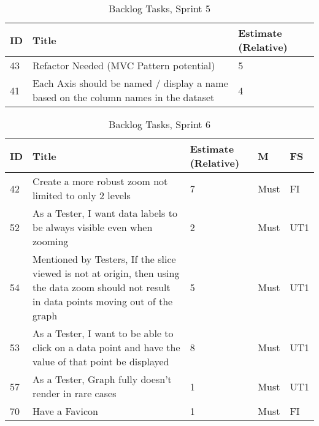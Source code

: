 \begin{table*}[hbt!]
    \begin{tabular}{ | l | l | l | }
        \hline
        ID & Title                                                                               & Estimate (Relative) \\
        \hline
        43 & Refactor Needed (MVC Pattern potential)                                             & 5                   \\
        \hline
        41 & Each Axis should be named / display a name based on the column names in the dataset & 4                   \\
        \hline
    \end{tabular}
    \caption{Backlog Tasks, Sprint 5}
    \label{sprint5}
\end{table*}

\begin{table*}[hbt!]
    \begin{tabular}{ | l | l | l | l | l | }
        \hline
        ID & Title                                                                                                                                                  & Estimate (Relative) & M    & FS  \\
        \hline
        42 & Create a more robust zoom not limited to only 2 levels                                                                                                 & 7                   & Must & FI  \\
        \hline
        52 & As a Tester, I want data labels to be always visible even when zooming                                                                                 & 2                   & Must & UT1 \\
        \hline
        54 & Mentioned by Testers, If the slice viewed is not at origin, \newline then using the data zoom should not result in data points moving out of the graph & 5                   & Must & UT1 \\
        \hline
        53 & As a Tester, I want to be able to click on a data point and have the value of that point be displayed                                                  & 8                   & Must & UT1 \\
        \hline
        57 & As a Tester, Graph fully doesn't render in rare cases                                                                                                  & 1                   & Must & UT1 \\
        \hline
        70 & Have a Favicon                                                                                                                                         & 1                   & Must & FI  \\
        \hline
    \end{tabular}
    \caption{Backlog Tasks, Sprint 6}
    \label{sprint6}
\end{table*}
